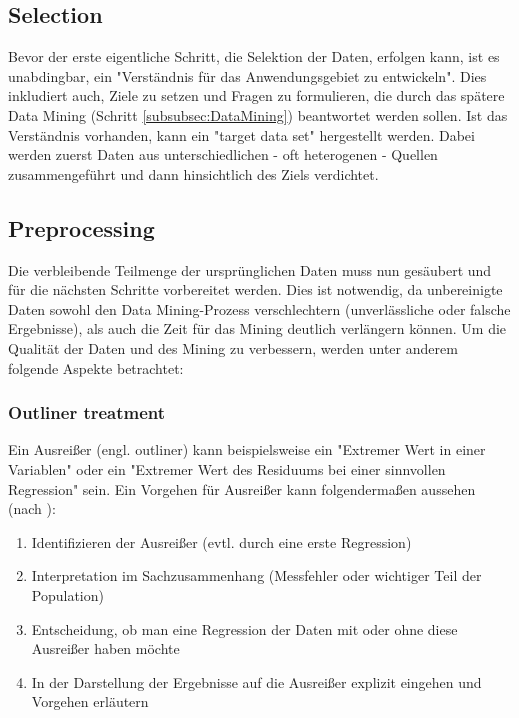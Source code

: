 \subsection{Selection}
Bevor der erste eigentliche Schritt, die Selektion der Daten, erfolgen kann, ist es unabdingbar, ein "Verständnis für das Anwendungsgebiet zu entwickeln".\citep[S.~42; eigene Übersetzung]{fayyad_data_1996} Dies inkludiert auch, Ziele zu setzen und Fragen zu formulieren, die durch das spätere Data Mining (Schritt \ref{subsubsec:DataMining}) beantwortet werden sollen. Ist das Verständnis vorhanden, kann ein "target data set"\citep[S.~42]{fayyad_data_1996} hergestellt werden. Dabei werden zuerst Daten aus unterschiedlichen - oft heterogenen - Quellen zusammengeführt und dann hinsichtlich des Ziels verdichtet.\citep[S.~70]{swamynathan_mastering_2017}

\subsection{Preprocessing}
Die verbleibende Teilmenge der ursprünglichen Daten muss nun gesäubert und für die nächsten Schritte vorbereitet werden. Dies ist notwendig, da unbereinigte Daten sowohl den Data Mining-Prozess verschlechtern (unverlässliche oder falsche Ergebnisse), als auch die Zeit für das Mining deutlich verlängern können.\citep[S.~70]{swamynathan_mastering_2017}
Um die Qualität der Daten und des Mining zu verbessern, werden unter anderem folgende Aspekte betrachtet:

\subsubsection{Outliner treatment}
Ein Ausreißer (engl. outliner) kann beispielsweise ein "Extremer Wert in einer Variablen" oder ein "Extremer Wert des Residuums bei einer sinnvollen Regression"\citep[S.~25; Teil 5b]{hertle_datenanalyse_2016} sein. Ein Vorgehen für Ausreißer kann folgendermaßen aussehen (nach \citep[S.~25; Teil 5b]{hertle_datenanalyse_2016}):
\begin{enumerate}
\item Identifizieren der Ausreißer (evtl. durch eine erste Regression)
\item Interpretation im Sachzusammenhang (Messfehler oder wichtiger Teil der Population)
\item Entscheidung, ob man eine Regression der Daten mit oder ohne diese Ausreißer haben möchte
\item In der Darstellung der Ergebnisse auf die Ausreißer explizit eingehen und Vorgehen erläutern
\end{enumerate}

